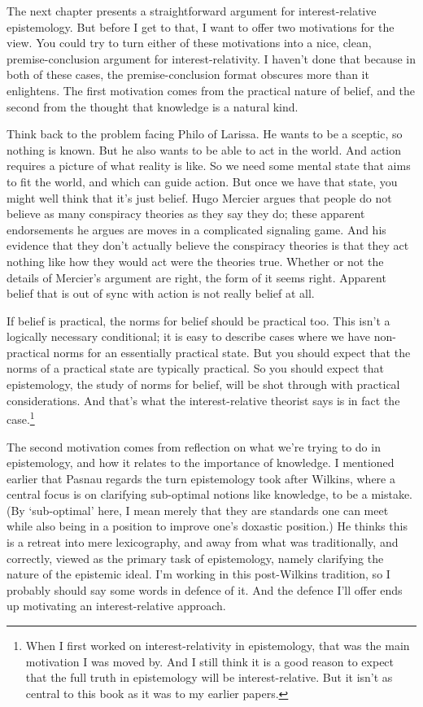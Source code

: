 \documentclass[
  11pt,
]{book}
\begin{document}
The next chapter presents a straightforward argument for interest-relative epistemology. But before I get to that, I want to offer two motivations for the view. You could try to turn either of these motivations into a nice, clean, premise-conclusion argument for interest-relativity. I haven't done that because in both of these cases, the premise-conclusion format obscures more than it enlightens. The first motivation comes from the practical nature of belief, and the second from the thought that knowledge is a natural kind.

Think back to the problem facing Philo of Larissa. He wants to be a sceptic, so nothing is known. But he also wants to be able to act in the world. And action requires a picture of what reality is like. So we need some mental state that aims to fit the world, and which can guide action. But once we have that state, you might well think that it's just belief. Hugo Mercier \citeyearpar{Mercier2020} argues that people do not believe as many conspiracy theories as they say they do; these apparent endorsements he argues are moves in a complicated signaling game. And his evidence that they don't actually believe the conspiracy theories is that they act nothing like how they would act were the theories true. Whether or not the details of Mercier's argument are right, the form of it seems right. Apparent belief that is out of sync with action is not really belief at all.

If belief is practical, the norms for belief should be practical too. This isn't a logically necessary conditional; it is easy to describe cases where we have non-practical norms for an essentially practical state. But you should expect that the norms of a practical state are typically practical. So you should expect that epistemology, the study of norms for belief, will be shot through with practical considerations. And that's what the interest-relative theorist says is in fact the case.\footnote{When I first worked on interest-relativity in epistemology, that was the main motivation I was moved by. And I still think it is a good reason to expect that the full truth in epistemology will be interest-relative. But it isn't as central to this book as it was to my earlier papers.}

The second motivation comes from reflection on what we're trying to do in epistemology, and how it relates to the importance of knowledge. I mentioned earlier that Pasnau regards the turn epistemology took after Wilkins, where a central focus is on clarifying sub-optimal notions like knowledge, to be a mistake. (By `sub-optimal' here, I mean merely that they are standards one can meet while also being in a position to improve one's doxastic position.) He thinks this is a retreat into mere lexicography, and away from what was traditionally, and correctly, viewed as the primary task of epistemology, namely clarifying the nature of the epistemic ideal. I'm working in this post-Wilkins tradition, so I probably should say some words in defence of it. And the defence I'll offer ends up motivating an interest-relative approach.
\end{document}
